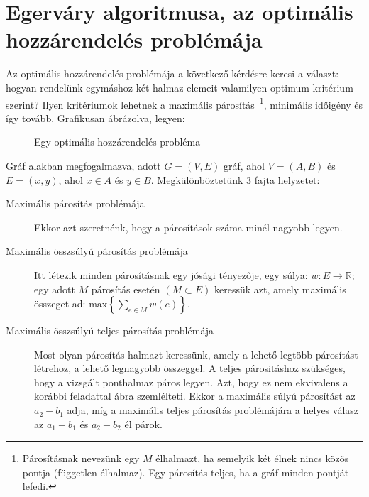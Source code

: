 \section{Egerváry algoritmusa, az optimális hozzárendelés problémája}

Az optimális hozzárendelés problémája a következő kérdésre keresi a választ:
hogyan rendelünk egymáshoz két halmaz elemeit valamilyen optimum kritérium
szerint? Ilyen kritériumok lehetnek a maximális párosítás~\footnote{ Párosításnak
nevezünk egy $M$ élhalmazt, ha semelyik két élnek nincs közös pontja (független
élhalmaz). Egy párosítás teljes, ha a gráf minden pontját lefedi.}, minimális
időigény és így tovább. Grafikusan ábrázolva, legyen:

\begin{figure}[ht]
\caption{Egy optimális hozzárendelés probléma}
\label{fig:OptHozProb}
\centering {} 
\end{figure}

Gráf alakban megfogalmazva, adott $G=(V, E)$ gráf, ahol $V=(A, B)$ és $E=(x,y)$,
ahol $x \in A$ és $ y \in B$. Megkülönböztetünk $3$ fajta helyzetet:
\begin{description}
  \item[Maximális párosítás problémája] Ekkor azt szeretnénk, hogy a párosítások
  száma minél nagyobb legyen.
  \item[Maximális összsúlyú párosítás problémája] Itt létezik minden párosításnak
  egy jósági tényezője, egy súlya: $w:E\rightarrow\mathbb{R}$; egy adott $M$
  párosítás esetén $(M\subset E)$ keressük azt, amely maximális összeget ad:
  $\mbox{max}\left\{\sum_{e\in M}{w(e)}\right\}$.
  \item[Maximális összsúlyú teljes párosítás problémája] Most olyan párosítás halmazt
  keressünk, amely a lehető legtöbb párosítást létrehoz, a lehető legnagyobb
  összeggel. A teljes párositáshoz szükséges, hogy a vizsgált ponthalmaz páros
  legyen. Azt, hogy ez nem ekvivalens a korábbi feladattal
   ábra szemlélteti. Ekkor a maximális súlyú párosítást
  az $a_2-b_1$ adja, míg a maximális teljes párosítás problémájára a helyes
  válasz az $a_1-b_1$ és $a_2-b_2$ él párok.
\end{description}

